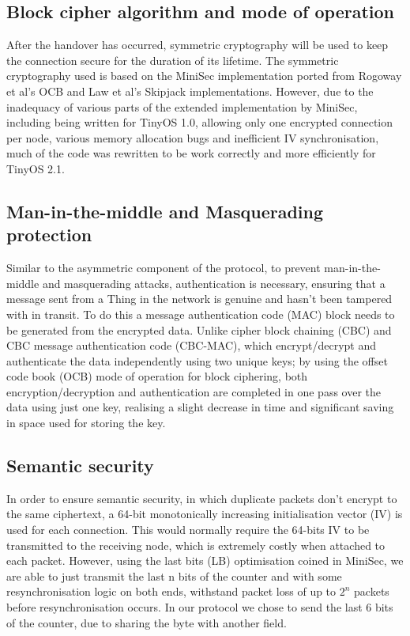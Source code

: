 \documentclass[conference]{./sty/IEEEtran}
\begin{document}
\subsection{Block cipher algorithm and mode of operation} %
\label{sub:cipher_block_algorithm_and_mode_of_operation}
After the handover has occurred, symmetric cryptography will be used to keep the connection secure for the duration of its lifetime. The symmetric cryptography used is based on the MiniSec implementation ported from Rogoway et al's OCB\cite{OCB} and Law et al's Skipjack\cite{Skipjack} implementations. However, due to the inadequacy of various parts of the extended implementation by MiniSec\cite{MiniSecLink}, including being written for TinyOS 1.0, allowing only one encrypted connection per node, various memory allocation bugs and inefficient IV synchronisation, much of the code was rewritten to be work correctly and more efficiently for TinyOS 2.1. 

\subsection{Man-in-the-middle and Masquerading protection} %
\label{sub:man_in_the_middle_and_masquerading_protection}
Similar to the asymmetric component of the protocol, to prevent man-in-the-middle and masquerading attacks, authentication is necessary, ensuring that a message sent from a Thing in the network is genuine and hasn't been tampered with in transit. To do this a message authentication code (MAC) block needs to be generated from the encrypted data. Unlike cipher block chaining (CBC) and CBC message authentication code (CBC-MAC), which encrypt/decrypt and authenticate the data independently using two unique keys; by using the offset code book (OCB) mode of operation for block ciphering, both encryption/decryption and authentication are completed in one pass over the data using just one key, realising a slight decrease in time\cite{ContikiSec} and significant saving in space used for storing the key.

\subsection{Semantic security} %
\label{sub:semantic_security}
In order to ensure semantic security, in which duplicate packets don't encrypt to the same ciphertext, a 64-bit monotonically increasing initialisation vector (IV) is used for each connection. This would normally require the 64-bits IV to be transmitted to the receiving node, which is extremely costly when attached to each packet. However, using the last bits (LB) optimisation coined in MiniSec, we are able to just transmit the last n bits of the counter and with some resynchronisation logic on both ends, withstand packet loss of up to $2^n$ packets before resynchronisation occurs. In our protocol we chose to send the last 6 bits of the counter, due to sharing the byte with another field.
\end{document}
